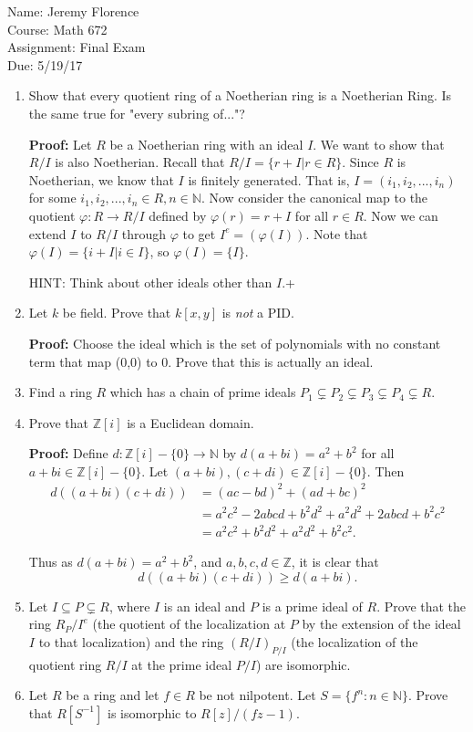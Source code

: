 \documentclass{article}
\newcommand\Proof{%
	\textbf{Proof:} %
}
\begin{document}
Name: Jeremy Florence \\
Course: Math 672 \\
Assignment: Final Exam \\
Due: 5/19/17

\begin{enumerate}
	\item Show that every quotient ring of a Noetherian ring is a Noetherian Ring. Is the same true for "every subring of..."?
	
	\Proof Let $R$ be a Noetherian ring with an ideal $I$. We  want to show that $R/I$ is also Noetherian. Recall that $R/I=\{r+I|r \in R \}$. Since $R$ is Noetherian, we know that $I$ is finitely generated. That is, $I=(i_1,i_2,...,i_n)$ for some $i_1,i_2,...,i_n \in R, n \in \mathbb{N}$. Now consider the canonical map to the quotient $\varphi:R \to R/I$ defined by $\varphi(r)=r+I$ for all $r \in R$. Now we can extend $I$ to $R/I$ through $\varphi$ to get $I^e=(\varphi(I))$. Note that $\varphi(I)=\{i+I|i \in I\}$, so $\varphi(I)=\{I\}$.
	
	HINT: Think about other ideals other than $I$.+
	
	\item Let $k$ be field. Prove that $k[x,y]$ is \emph{not} a PID.
	
	\Proof Choose the ideal which is the set of polynomials with no constant term that map (0,0) to 0. Prove that this is actually an ideal.
	
	\item Find a ring $R$ which has a chain of prime ideals $P_1 \subsetneq P_2 \subsetneq P_3 \subsetneq P_4 \subsetneq R$.
	
	\item Prove that $\mathbb{Z}[i]$ is a Euclidean domain.
	
	\Proof Define $d: \mathbb{Z}[i]-\{0\} \to \mathbb{N}$ by $d(a+bi)=a^2+b^2$ for all $a+bi \in \mathbb{Z}[i]-\{0\}$. Let $(a+bi),(c+di) \in \mathbb{Z}[i]-\{0\}$. Then	
	\[
		\begin{split}
			d((a+bi)(c+di))&=(ac-bd)^2+(ad+bc)^2 \\
							&= a^2c^2-2abcd+b^2d^2+a^2d^2+2abcd+b^2c^2\\
							&= a^2c^2+b^2d^2+a^2d^2+b^2c^2.
		\end{split}
	\]
	
	Thus as $d(a+bi)=a^2+b^2$, and $a,b,c,d \in \mathbb{Z}$, it is clear that $$d((a+bi)(c+di)) \geq d(a+bi).$$
	
	
	
	\item Let $I \subseteq P \subsetneq R$, where $I$ is an ideal and $P$ is a prime ideal of $R$. Prove that the ring $R_P/I^e$ (the quotient of the localization at $P$ by the extension of the ideal $I$ to that localization) and the ring $(R/I)_{P/I}$ (the localization of the quotient ring $R/I$ at the prime ideal $P/I$) are isomorphic.
	
	\item Let $R$ be a ring and let $f \in R$ be not nilpotent. Let $S=\{f^n:n \in \mathbb{N}\}$. Prove that $R[S^{-1}]$ is isomorphic to $R[z]/(fz-1)$. 
\end{enumerate}
\end{document}
